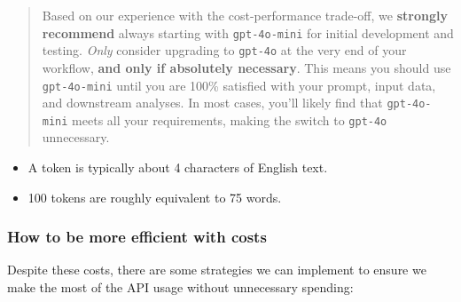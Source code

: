 \documentclass[
  letterpaper,
  DIV=11,
  numbers=noendperiod]{scrreprt}
\begin{document}
\begin{quote}
Based on our experience with the cost-performance trade-off, we
\textbf{strongly recommend} always starting with \texttt{gpt-4o-mini}
for initial development and testing. \emph{Only} consider upgrading to
\texttt{gpt-4o} at the very end of your workflow, \textbf{and only if
absolutely necessary}. This means you should use \texttt{gpt-4o-mini}
until you are 100\% satisfied with your prompt, input data, and
downstream analyses. In most cases, you'll likely find that
\texttt{gpt-4o-mini} meets all your requirements, making the switch to
\texttt{gpt-4o} unnecessary.
\end{quote}

\begin{tcolorbox}[enhanced jigsaw, opacitybacktitle=0.6, breakable, title=\textcolor{quarto-callout-note-color}{\faInfo}\hspace{0.5em}{Tokens to Words}, arc=.35mm, colframe=quarto-callout-note-color-frame, colbacktitle=quarto-callout-note-color!10!white, left=2mm, bottomrule=.15mm, opacityback=0, toprule=.15mm, bottomtitle=1mm, toptitle=1mm, titlerule=0mm, leftrule=.75mm, colback=white, rightrule=.15mm, coltitle=black]

\begin{itemize}
\item
  A token is typically about 4 characters of English text.
\item
  100 tokens are roughly equivalent to 75 words.
\end{itemize}

\end{tcolorbox}

\subsubsection{How to be more efficient with
costs}\label{how-to-be-more-efficient-with-costs}

Despite these costs, there are some strategies we can implement to
ensure we make the most of the API usage without unnecessary spending:
\end{document}

